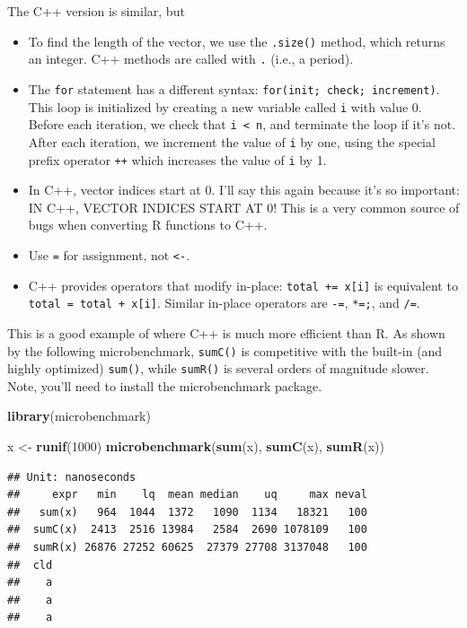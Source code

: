 \documentclass[
]{krantz}
\newenvironment{Shaded}{\begin{snugshade}}{\end{snugshade}}
\newcommand{\DecValTok}[1]{\textcolor[rgb]{0.00,0.00,0.81}{#1}}
\newcommand{\KeywordTok}[1]{\textcolor[rgb]{0.13,0.29,0.53}{\textbf{#1}}}
\newcommand{\NormalTok}[1]{#1}
\newcommand{\StringTok}[1]{\textcolor[rgb]{0.31,0.60,0.02}{#1}}
\begin{document}
The C++ version is similar, but

\begin{itemize}
\item
  To find the length of the vector, we use the \texttt{.size()} method, which returns an integer. C++ methods are called with \texttt{.} (i.e., a period).
\item
  The \texttt{for} statement has a different syntax: \texttt{for(init;\ check;\ increment)}. This loop is initialized by creating a new variable called \texttt{i} with value 0. Before each iteration, we check that \texttt{i\ \textless{}\ n}, and terminate the loop if it's not. After each iteration, we increment the value of \texttt{i} by one, using the special prefix operator \texttt{++} which increases the value of \texttt{i} by 1.
\item
  In C++, vector indices start at 0. I'll say this again because it's so important: IN C++, VECTOR INDICES START AT 0! This is a very common source of bugs when converting R functions to C++.
\item
  Use \texttt{=} for assignment, not \texttt{\textless{}-}.
\item
  C++ provides operators that modify in-place: \texttt{total\ +=\ x{[}i{]}} is equivalent to \texttt{total\ =\ total\ +\ x{[}i{]}}. Similar in-place operators are \texttt{-=}, \texttt{*=;}, and \texttt{/=}.
\end{itemize}

This is a good example of where C++ is much more efficient than R. As shown by the following microbenchmark, \texttt{sumC()} is competitive with the built-in (and highly optimized) \texttt{sum()}, while \texttt{sumR()} is several orders of magnitude slower. Note, you'll need to install the microbenchmark package.

\begin{Shaded}
\begin{Highlighting}[]
\KeywordTok{library}\NormalTok{(microbenchmark)}

\NormalTok{x \textless{}{-}}\StringTok{ }\KeywordTok{runif}\NormalTok{(}\DecValTok{1000}\NormalTok{)}
\KeywordTok{microbenchmark}\NormalTok{(}\KeywordTok{sum}\NormalTok{(x), }\KeywordTok{sumC}\NormalTok{(x), }\KeywordTok{sumR}\NormalTok{(x))}
\end{Highlighting}
\end{Shaded}

\begin{verbatim}
## Unit: nanoseconds
##     expr   min    lq  mean median    uq     max neval
##   sum(x)   964  1044  1372   1090  1134   18321   100
##  sumC(x)  2413  2516 13984   2584  2690 1078109   100
##  sumR(x) 26876 27252 60625  27379 27708 3137048   100
##  cld
##    a
##    a
##    a
\end{verbatim}
\end{document}
